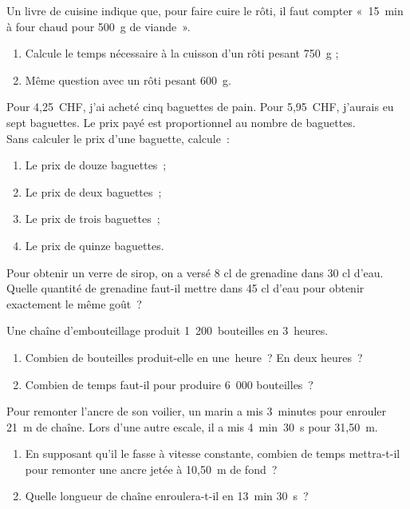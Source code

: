 \begin{exercice}[Cuisson]
Un livre de cuisine indique que, pour faire cuire le rôti, il faut compter « 15 min à four chaud pour 500 g de viande ».
\begin{enumerate}
 \item Calcule le temps nécessaire à la cuisson d'un rôti pesant 750 g ;
 \item Même question avec un rôti pesant 600 g.
 \end{enumerate}
\end{exercice}


\begin{exercice}
Pour 4,25 CHF, j'ai acheté cinq baguettes de pain. Pour 5,95 CHF, j'aurais eu sept baguettes. Le prix payé est proportionnel au nombre de baguettes. \\[0.5em]
Sans calculer le prix d'une baguette, calcule :
\begin{enumerate}
 \item Le prix de douze baguettes ;
 \item Le prix de deux baguettes ;
 \item Le prix de trois baguettes ;
 \item Le prix de quinze baguettes.
 \end{enumerate}
\end{exercice}


\begin{exercice}
Pour obtenir un verre de sirop, on a versé 8 cl de grenadine dans 30 cl d’eau. \\[0.5em]
Quelle quantité de grenadine faut-il mettre dans 45 cl d’eau pour obtenir exactement le même goût ?
\end{exercice}


\begin{exercice}
Une chaîne d’embouteillage produit 1 200 bouteilles en 3 heures.
\begin{enumerate}
 \item Combien de bouteilles produit-elle en une heure ? En deux heures ?
 \item Combien de temps faut-il pour produire 6 000 bouteilles ?
 \end{enumerate}
\end{exercice}


\begin{exercice}
Pour remonter l'ancre de son voilier, un marin a mis 3 minutes pour enrouler 21 m de chaîne. Lors d’une autre escale, il a mis 4 min 30 s pour 31,50 m.
\begin{enumerate}
 \item En supposant qu'il le fasse à vitesse constante, combien de temps mettra-t-il pour remonter une ancre jetée à 10,50 m de fond ?
 \item Quelle longueur de chaîne enroulera-t-il en 13 min 30 s ?
 \end{enumerate}
\end{exercice}


